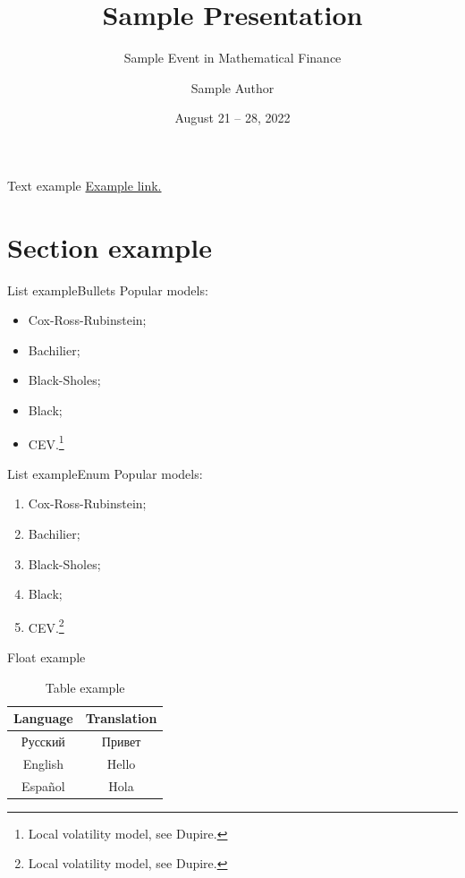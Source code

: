 \documentclass[aspectratio=169]{beamer}
\title{Sample Presentation}
\subtitle{Sample Event in Mathematical Finance}
\author{Sample Author}
\institute{Vega Institute Foundation}
\date{August 21 -- 28, 2022}
\begin{document}
    \maketitle

    \begin{frame}{Text example}
        \lipsum[1]
        \href{example.com}{Example link.}
    \end{frame}

    \section{Section example}
    \begin{frame}{List example}{Bullets}
        Popular models:
        \begin{itemize}
            \item Cox-Ross-Rubinstein;
            \item Bachilier;
            \item Black-Sholes;
            \item Black;
            \item CEV.\footnote{Local volatility model, see Dupire.}
        \end{itemize}
    \end{frame}

    \begin{frame}{List example}{Enum} 
        Popular models:
        \begin{enumerate}
            \item Cox-Ross-Rubinstein;
            \item Bachilier;
            \item Black-Sholes;
            \item Black;
            \item CEV.\footnote{Local volatility model, see Dupire.}
        \end{enumerate}
    \end{frame}

    \begin{frame}{Float example}
        \begin{table}
            \begin{tabular}{|c|c|}\hline
                Language & Translation\\\hline\hline
                Русский & Привет\\\hline
                English & Hello\\\hline
                Espa\~nol & Hola\\\hline
            \end{tabular}
            \caption{Table example}
        \end{table}
    \end{frame}
\end{document}
